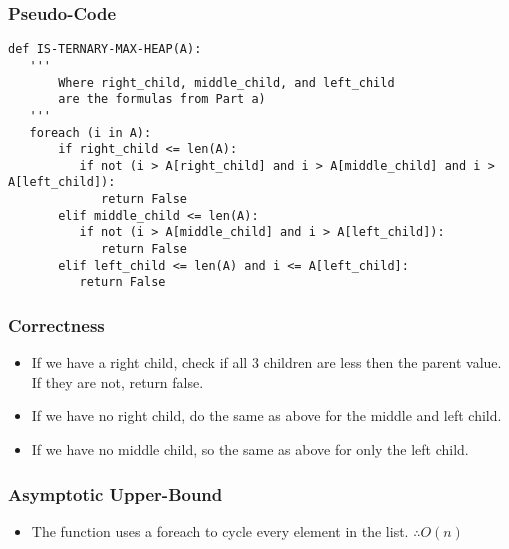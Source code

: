 \documentclass[11pt]{article}
\begin{document}
\subsubsection{Pseudo-Code}
\label{sec-2-4-1}
\begin{verbatim}
def IS-TERNARY-MAX-HEAP(A):
   '''
       Where right_child, middle_child, and left_child
       are the formulas from Part a)
   '''
   foreach (i in A):
       if right_child <= len(A):
          if not (i > A[right_child] and i > A[middle_child] and i > A[left_child]):
             return False
       elif middle_child <= len(A):
          if not (i > A[middle_child] and i > A[left_child]):
             return False
       elif left_child <= len(A) and i <= A[left_child]:
          return False
\end{verbatim}
\subsubsection{Correctness}
\label{sec-2-4-2}
\begin{itemize}
\item If we have a right child, check if all 3 children are less then the parent value. If they are not, return false.
\item If we have no right child, do the same as above for the middle and left child.
\item If we have no middle child, so the same as above for only the left child.
\end{itemize}
\subsubsection{Asymptotic Upper-Bound}
\label{sec-2-4-3}
\begin{itemize}
\item The function uses a foreach to cycle every element in the list. $\therefore O(n)$
\end{itemize}
\end{document}
